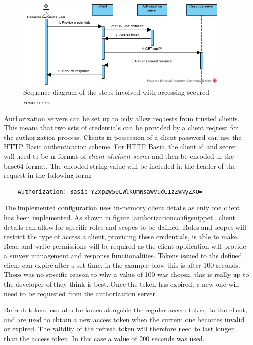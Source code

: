 \clearpage
\begin{figure}[ht]
    \centering
    \includegraphics[width=400px]{images/oauth_grant_flow.png}
    \caption{Sequence diagram of the steps involved with accessing secured resources}
    \label{oauthgrantflow}
\end{figure}

Authorization servers can be set up to only allow requests from trusted clients.
This means that two sets of credentials can be provided by a client request for the authorization process.
Clients in possession of a client password can use the HTTP Basic authentication scheme.
For HTTP Basic, the client id and secret will need to be in format of \textit{client-id:client-secret} and then be encoded in the
base64 format. The encoded string value will be included in the header of the request in the following form: 

\begin{verbatim}
    Authorization: Basic Y2xpZW50LWlkOmNsaWVudC1zZWNyZXQ=
\end{verbatim}

The implemented configuration uses in-memory client details as only one client has been implemented.
As shown in figure \ref{authorizationconfigsnippet}, client details can allow for specific roles and scopes to be defined.
Roles and scopes will restrict the type of access a client, providing these credentials, is able to make.
Read and write permissions will be required as the client application will provide a survey management and response functionalities.
Tokens issued to the defined client can expire after a set time, in the example blow this is after 100 seconds.
There was no specific reason to why a value of 100 was chosen, this is really up to the developer of they think is best.
Once the token has expired, a new one will need to be requested from the authorization server.

Refresh tokens can also be issues alongside the regular access token, to the client, and are used to obtain a new access token when 
the current one becomes invalid or expired. 
The validity of the refresh token will therefore need to last longer than the access token.
In this case a value of 200 seconds was used. 

